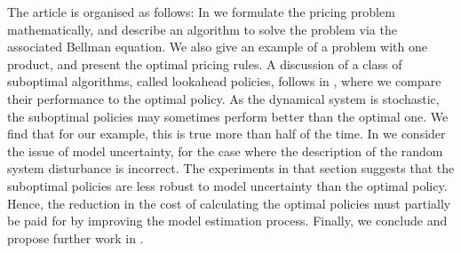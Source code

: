 \documentclass[main.tex]{subfiles}
\begin{document}
The article is organised as follows:
In  we formulate the
pricing problem mathematically, and describe an algorithm to solve the
problem via the associated Bellman equation. We also give an example
of a problem with one product, and present the optimal pricing rules.
A discussion of a class of suboptimal
algorithms, called lookahead policies, follows in
, where we compare their performance to
the optimal policy. As the dynamical system is stochastic, the
suboptimal policies may sometimes perform better than the optimal
one. We find that for our example, this is  true more than half of
the time.
In  we consider the issue of
model uncertainty, for the case where the description of the random system
disturbance is incorrect. The experiments in that section suggests
that the suboptimal policies are less robust to model uncertainty
than the optimal policy. Hence, the reduction in the cost
of calculating the optimal policies must partially be paid for
by improving the model estimation process.
Finally, we conclude and propose further work in .

\biblio
\end{document}
